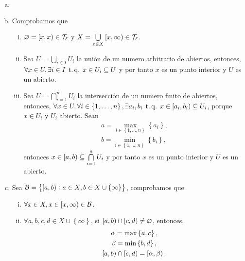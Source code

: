 \begin{eje}
    \begin{enumerate}[(a)]
        \item[]
        \item Comprobamos que
            \begin{enumerate}[i)]
                \item $\varnothing = \left[ x, x \right) \in \mathcal{T}_\ell$ y $X = \bigcup\limits_{x \in X} \left[ x, \infty \right) \in \mathcal{T}_\ell$.
                \item Sea $U = \bigcup\limits_{i \in I} U_i$ la unión de un numero arbitrario de abiertos, entonces, $\forall x \in U, \exists i \in I \operatorname{\;t.q.\;} x \in U_i \subseteq U$ y por tanto $x$ es un punto interior y $U$ es un abierto.
                \item Sea $U = \bigcap\limits_{i = 1}^n U_i$ la intersección de un numero finito de abiertos, entonces, $\forall x \in U, \forall i \in \left\{ 1, \dots, n \right\}, \exists a_i, b_i \operatorname{\;t.q.\;} x \in \left[a_i, b_i\right) \subseteq U_i$, porque $x \in U_i$ y $U_i$ abierto. Sean
                    \begin{gather*}
                        a = \max_{i \in \left\{ 1, \dots, n \right\}} \left\{a_i\right\}, \\
                        b = \min_{i \in \left\{ 1, \dots, n \right\}} \left\{b_i\right\},
                    \end{gather*}
                entonces $x \in \left[ a, b \right) \subseteq \bigcap\limits_{i = 1}^n U_i$ y por tanto $x$ es un punto interior y $U$ es un abierto.
            \end{enumerate}
        \item Sea $\mathcal{B} = \left\{ \left[ a, b \right) \colon a \in X, b \in X \cup \left\{ \infty \right\} \right\}$, comprobamos que
            \begin{enumerate}[i)]
                \item $\forall x \in X, x \in \left[ x, \infty \right) \in \mathcal{B}$.
                \item $\forall a, b, c, d \in X \cup \left\{ \infty \right\}$, si $\left[ a, b \right) \cap \left[ c, d \right) \neq \varnothing$, entonces,
                    \begin{gather*}
                        \alpha = \max \left\{ a, c \right\}, \\
                        \beta = \min \left\{ b, d \right\}, \\
                        \left[ a, b \right) \cap \left[ c, d \right) = \left[ \alpha, \beta \right).
                    \end{gather*}

\end{enumerate}
\end{enumerate}
\end{eje}
